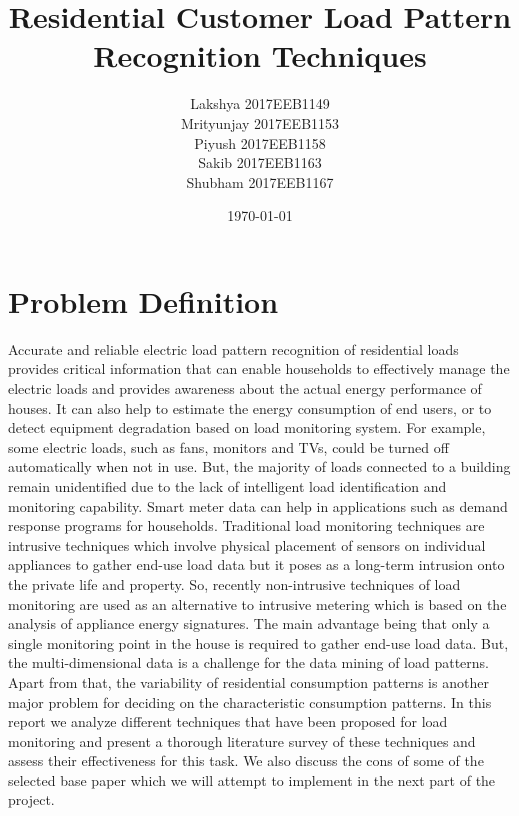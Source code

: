 \documentclass[11pt, a4paper]{article} %
\title{Residential Customer Load Pattern Recognition Techniques} %
\author{
Lakshya 2017EEB1149 \\ 
Mrityunjay 2017EEB1153 \\ 
Piyush 2017EEB1158 \\ 
Sakib 2017EEB1163 \\ 
Shubham 2017EEB1167 %
  }
\date{\small \today} %
\begin{document}
%

\maketitle %


\setcounter{page}{1} %

\section{Problem Definition}
Accurate and reliable electric load pattern recognition of residential loads provides critical information that can enable households to effectively manage the electric loads and provides awareness about the actual energy performance of houses. It can also help to estimate the energy consumption of end users, or to detect equipment degradation based on load monitoring system. For example, some electric loads, such as fans, monitors and TVs, could be turned off automatically when not in use. But, the majority of loads connected to a building remain unidentified due to the lack of intelligent load identification and monitoring capability. Smart meter data can help in applications such as demand response programs for households. Traditional load monitoring techniques are intrusive techniques which involve physical placement of sensors on individual appliances to gather end-use load data but it poses as a long-term intrusion onto the private life and property. So, recently non-intrusive techniques of load monitoring are used as an alternative to intrusive metering which is based on the analysis of appliance energy signatures. The main advantage being that only a single monitoring point in the house is required to gather end-use load data.
But, the multi-dimensional data is a challenge for the data mining of load patterns. Apart from that, the variability of residential consumption patterns is another major problem for deciding on the characteristic consumption patterns. In this report we analyze different techniques that have been proposed for load monitoring and present a thorough literature survey of these techniques and assess their effectiveness for this task. We also discuss the cons of some of the selected base paper which we will attempt to implement in the next part of the project.
\end{document}
